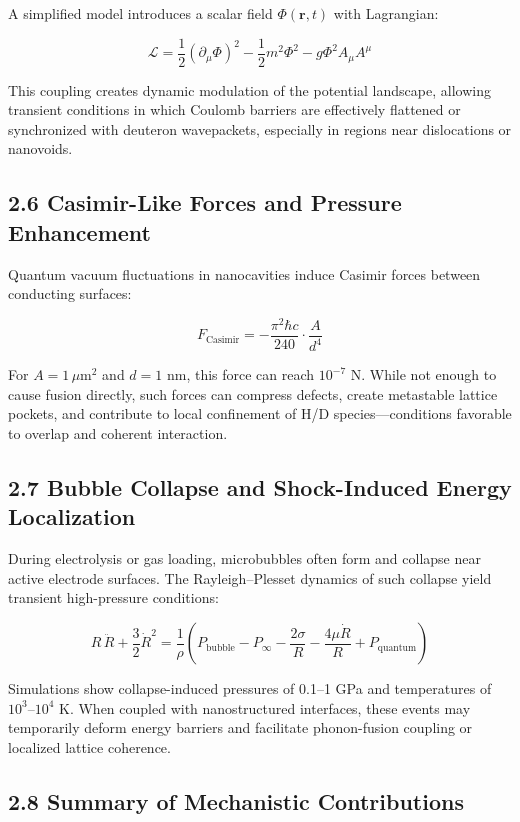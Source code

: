     A simplified model introduces a scalar field $\Phi(\mathbf{r}, t)$ with Lagrangian:
    
    \[
    \mathcal{L} = \frac{1}{2}(\partial_\mu \Phi)^2 - \frac{1}{2}m^2 \Phi^2 - g \Phi^2 A_\mu A^\mu
    \]
    
    This coupling creates dynamic modulation of the potential landscape, allowing transient conditions in which Coulomb barriers are effectively flattened or synchronized with deuteron wavepackets, especially in regions near dislocations or nanovoids.
    
    \subsection{2.6 Casimir-Like Forces and Pressure Enhancement}
    
    Quantum vacuum fluctuations in nanocavities induce Casimir forces between conducting surfaces:
    
    \[
    F_{\text{Casimir}} = -\frac{\pi^2 \hbar c}{240} \cdot \frac{A}{d^4}
    \]
    
    For $A = 1\,\mu$m$^2$ and $d = 1$ nm, this force can reach $10^{-7}$ N. While not enough to cause fusion directly, such forces can compress defects, create metastable lattice pockets, and contribute to local confinement of H/D species—conditions favorable to overlap and coherent interaction.
    
    \subsection{2.7 Bubble Collapse and Shock-Induced Energy Localization}
    
    During electrolysis or gas loading, microbubbles often form and collapse near active electrode surfaces. The Rayleigh–Plesset dynamics of such collapse yield transient high-pressure conditions:
    
    \[
    R\,\ddot{R} + \frac{3}{2} \dot{R}^2 = \frac{1}{\rho} \left( P_{\text{bubble}} - P_\infty - \frac{2\sigma}{R} - \frac{4\mu \dot{R}}{R} + P_{\text{quantum}} \right)
    \]
    
    Simulations show collapse-induced pressures of 0.1–1 GPa and temperatures of $10^3$–$10^4$ K. When coupled with nanostructured interfaces, these events may temporarily deform energy barriers and facilitate phonon-fusion coupling or localized lattice coherence.
    
    \subsection{2.8 Summary of Mechanistic Contributions}
    
